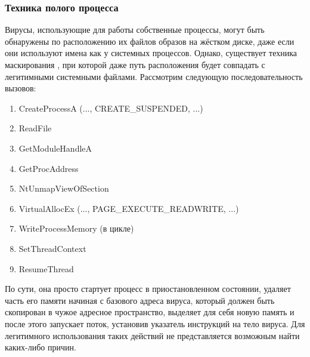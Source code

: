\subsubsection {Техника полого процесса}
Вирусы, использующие для работы собственные процессы, могут быть обнаружены по расположению их файлов образов на жёстком диске, даже если они используют имена как у системных процессов. Однако, существует техника маскирования \cite{MALWAREBOOK}, при которой даже путь расположения будет совпадать с легитимными системными файлами.
Рассмотрим следующую последовательность вызовов:
\begin {enumerate}
	\item CreateProcessA (..., CREATE\_SUSPENDED, ...)
	\item ReadFile
	\item GetModuleHandleA
	\item GetProcAddress
	\item NtUnmapViewOfSection
	\item VirtualAllocEx (..., PAGE\_EXECUTE\_READWRITE, ...)
	\item WriteProcessMemory (в цикле)
	\item SetThreadContext
	\item ResumeThread
\end{enumerate}
По сути, она просто стартует процесс в приостановленном состоянии, удаляет часть его памяти начиная с базового адреса вируса, который должен быть скопирован в чужое адресное пространство, выделяет для себя новую память и после этого запускает поток, установив указатель инструкций на тело вируса. Для легитимного использования таких действий не представляется возможным найти каких-либо причин.